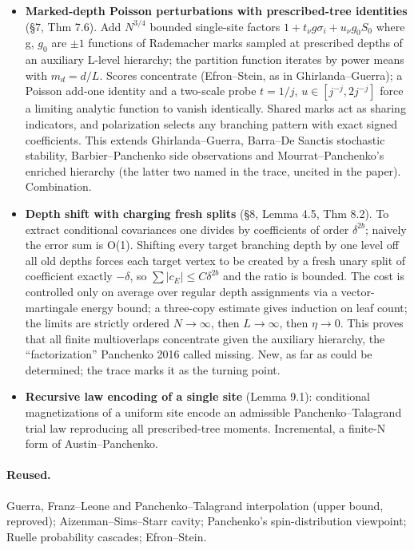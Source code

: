 \documentclass[11pt]{article}
\begin{document}
\begin{itemize}
\item \textbf{Marked-depth Poisson perturbations with prescribed-tree identities} (\S{}7, Thm 7.6). Add $N^{3/4}$ bounded single-site factors $1+t_\nu g\sigma_i+u_\nu g_0S_0$ where g, $g_{0}$ are $\pm1$ functions of Rademacher marks sampled at prescribed depths of an auxiliary L-level hierarchy; the partition function iterates by power means with $m_d=d/L$. Scores concentrate (Efron--Stein, as in Ghirlanda--Guerra); a Poisson add-one identity and a two-scale probe $t=1/j$, $u\in[j^{-j},2j^{-j}]$ force a limiting analytic function to vanish identically. Shared marks act as sharing indicators, and polarization selects any branching pattern with exact signed coefficients. This extends Ghirlanda--Guerra, Barra--De Sanctis stochastic stability, Barbier--Panchenko side observations and Mourrat--Panchenko's enriched hierarchy (the latter two named in the trace, uncited in the paper). Combination.
\item \textbf{Depth shift with charging fresh splits} (\S{}8, Lemma 4.5, Thm 8.2). To extract conditional covariances one divides by coefficients of order $\delta^{2b}$; naively the error sum is O(1). Shifting every target branching depth by one level off all old depths forces each target vertex to be created by a fresh unary split of coefficient exactly $-\delta$, so $\sum|c_E|\le C\delta^{2b}$ and the ratio is bounded. The cost is controlled only on average over regular depth assignments via a vector-martingale energy bound; a three-copy estimate gives induction on leaf count; the limits are strictly ordered $N\to\infty$, then $L\to\infty$, then $\eta\to0$. This proves that all finite multioverlaps concentrate given the auxiliary hierarchy, the ``factorization'' Panchenko 2016 called missing. New, as far as could be determined; the trace marks it as the turning point.
\item \textbf{Recursive law encoding of a single site} (Lemma 9.1): conditional magnetizations of a uniform site encode an admissible Panchenko--Talagrand trial law reproducing all prescribed-tree moments. Incremental, a finite-N form of Austin--Panchenko.
\end{itemize}

\paragraph{Reused.}

Guerra, Franz--Leone and Panchenko--Talagrand interpolation (upper bound, reproved); Aizenman--Sims--Starr cavity; Panchenko's spin-distribution viewpoint; Ruelle probability cascades; Efron--Stein.
\end{document}
